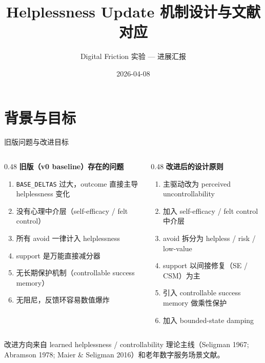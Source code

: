 \documentclass[aspectratio=169]{beamer}
\title[Helplessness Update]{Helplessness Update 机制设计与文献对应}
\subtitle{Digital Friction 实验 --- 进展汇报}
\date{2026-04-08}
\newcommand{\framebottomnote}[1]{%
    \vfill
    \par\noindent
    {\tiny\color{black!65}\parbox{0.96\linewidth}{#1}\par}%
    \vspace*{-0.75cm}%
}
\begin{document}
\begin{frame}
    \titlepage
\end{frame}

\section{背景与目标}

\begin{frame}{旧版问题与改进目标}

\begin{columns}[T]
\begin{column}{0.48\textwidth}
\textbf{旧版（v0 baseline）存在的问题}
\begin{enumerate}
    \item \texttt{BASE\_DELTAS} 过大，outcome 直接主导 helplessness 变化
    \item 没有心理中介层（self-efficacy / felt control）
    \item 所有 avoid 一律计入 helplessness
    \item support 是万能直接减分器
    \item 无长期保护机制（controllable success memory）
    \item 无阻尼，反馈环容易数值爆炸
\end{enumerate}
\end{column}

\begin{column}{0.48\textwidth}
\textbf{改进后的设计原则}
\begin{enumerate}
    \item 主驱动改为 perceived uncontrollability
    \item 加入 self-efficacy / felt control 中介层
    \item avoid 拆分为 helpless / risk / low-value
    \item support 以间接修复（SE / CSM）为主
    \item 引入 controllable success memory 做乘性保护
    \item 加入 bounded-state damping
\end{enumerate}
\end{column}
\end{columns}

\framebottomnote{改进方向来自 learned helplessness / controllability 理论主线（Seligman 1967; Abramson 1978; Maier \& Seligman 2016）和老年数字服务场景文献。}
\end{frame}
\end{document}
